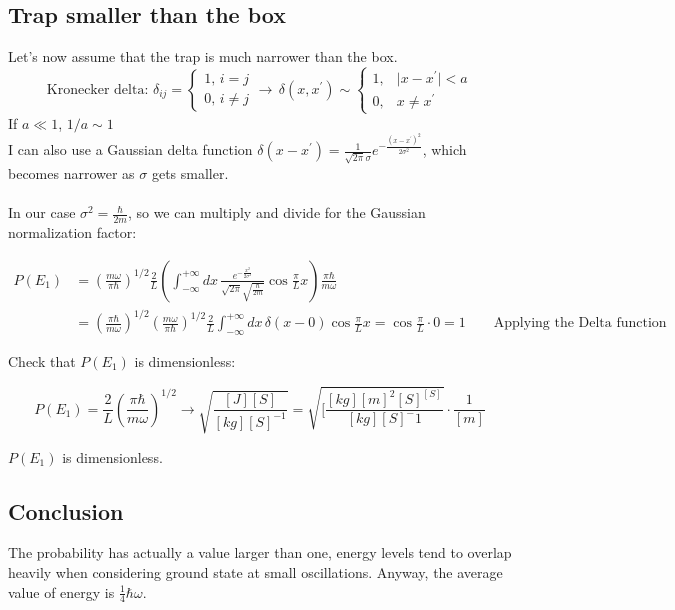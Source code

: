 	\subsection{Trap smaller than the box}
	Let's now assume that the trap is much narrower than the box.
	\[\text{Kronecker delta: }  \delta_{i j}=\begin{cases}1,\, i=j \\ 0,\, i \neq j \end{cases} \rightarrow\, \delta(x, x^{\prime}) \sim\begin{cases}1,& \mid x-x^{\prime} \mid<a \\ 0, & x \neq x^{\prime}\end{cases}
	\]
	If $a\ll1$, $1/a\sim 1$\\
	I can also use a Gaussian delta function  $\delta\left(x-x^{\prime}\right)=\frac{1}{\sqrt{2 \pi} \sigma} e^{-\frac{\left(x-x^{\prime}\right)^{2}}{2 \sigma^{2}}}$, which becomes narrower as $\sigma$ gets smaller.\\
	\\
	In our case $\sigma^2= \frac{\hbar}{2m}$, so we can multiply and divide for the Gaussian normalization factor:

	\begin{align*}
		P\left(E_{1}\right)&=\left(\frac{m \omega}{ \pi \hbar}\right)^{1 / 2} \frac{2}{L}\left(\int_{-\infty}^{+\infty} d x\, \frac{e^{-\frac{x^{2}}{2\sigma^2}}}{\sqrt{2 \pi} \sqrt{\frac{\hbar}{2 m}}} \cos \frac{\pi}{L} x\right) \frac{ \pi \hbar}{m \omega}\\
											 &=\left(\frac{ \pi \hbar}{m\omega}\right)^{1 / 2}\left(\frac{m \omega}{ \pi \hbar}\right)^{1 / 2} \frac{2}{L}\int_{-\infty}^{+\infty} d x\, \delta(x-0) \cos \frac{\pi}{L} x=\cos \frac{\pi}{L} \cdot0=1\qquad\text{Applying the Delta function}
	\end{align*}

	\noindent
	Check that $P(E_1)$ is dimensionless:

	$$P\left(E_{1}\right)=\frac{2}{L}\left(\frac{ \pi \hbar}{m \omega}\right)^{1 / 2} \rightarrow \sqrt{\frac{[J][S]}{[k g][S]^{-1}}}=\sqrt{[\frac{[kg][m]^2[S]^[S]}{[kg][S]^-1}} \cdot \frac{1}{[m]}$$

	$P\left(E_{1}\right)$ is dimensionless.

	\subsection{Conclusion}
	The probability has actually a value larger than one, energy levels tend to overlap heavily when considering ground state at small oscillations.
	Anyway, the average value of energy is $\frac{1}{4}\hbar\omega$.
